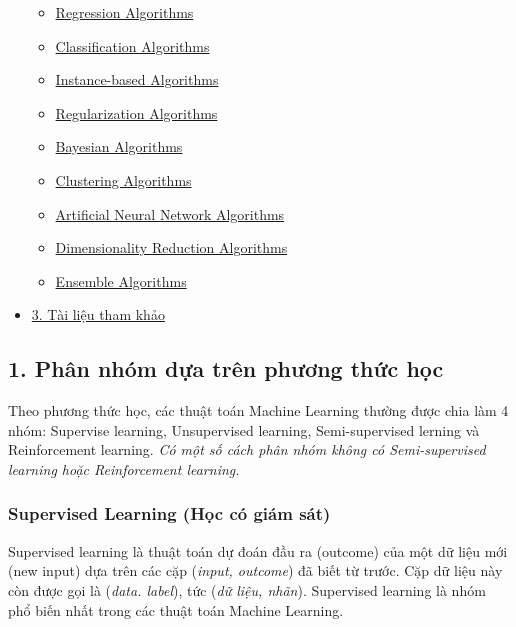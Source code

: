 \begin{itemize}
  \begin{itemize}
  \tightlist
  \item
    \protect\hyperlink{regression-algorithms}{Regression Algorithms}
  \item
    \protect\hyperlink{classification-algorithms}{Classification
    Algorithms}
  \item
    \protect\hyperlink{instance-based-algorithms}{Instance-based
    Algorithms}
  \item
    \protect\hyperlink{regularization-algorithms}{Regularization
    Algorithms}
  \item
    \protect\hyperlink{bayesian-algorithms}{Bayesian Algorithms}
  \item
    \protect\hyperlink{clustering-algorithms}{Clustering Algorithms}
  \item
    \protect\hyperlink{artificial-neural-network-algorithms}{Artificial
    Neural Network Algorithms}
  \item
    \protect\hyperlink{dimensionality-reduction-algorithms}{Dimensionality
    Reduction Algorithms}
  \item
    \protect\hyperlink{ensemble-algorithms}{Ensemble Algorithms}
  \end{itemize}
\item
  \protect\hyperlink{-tai-lieu-tham-khao}{3. Tài liệu tham khảo}
\end{itemize}

\subsection{1. Phân nhóm dựa trên phương thức
học}\label{phuxe2n-nhuxf3m-dux1ef1a-truxean-phux1b0ux1a1ng-thux1ee9c-hux1ecdc}

Theo phương thức học, các thuật toán Machine Learning thường được chia
làm 4 nhóm: Supervise learning, Unsupervised learning, Semi-supervised
lerning và Reinforcement learning. \emph{Có một số cách phân nhóm không
có Semi-supervised learning hoặc Reinforcement learning.}

\subsubsection{Supervised Learning (Học có giám
sát)}\label{supervised-learning-hux1ecdc-cuxf3-giuxe1m-suxe1t}

Supervised learning là thuật toán dự đoán đầu ra (outcome) của một dữ
liệu mới (new input) dựa trên các cặp (\emph{input, outcome}) đã biết từ
trước. Cặp dữ liệu này còn được gọi là (\emph{data. label}), tức
(\emph{dữ liệu, nhãn}). Supervised learning là nhóm phổ biến nhất trong
các thuật toán Machine Learning.

